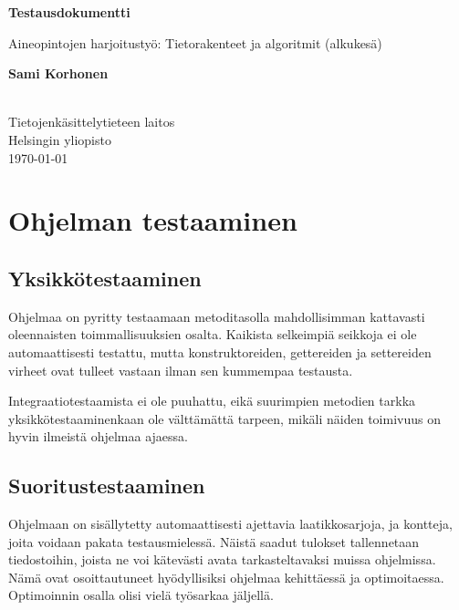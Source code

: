 \documentclass[a4paper,12pt, titlepage]{article}
\begin{document}
\begin{titlepage}
    \begin{center}
        \vspace*{1cm}
        
        \LARGE
        \textbf{Testausdokumentti}
        
        \vspace{0.5cm}
        \Large
        Aineopintojen harjoitustyö: Tietorakenteet ja algoritmit (alkukesä)
        
        \vspace{1.5cm}
        
        \large
        \textbf{Sami Korhonen} \\
         \\
        
		\vfill        
        \normalsize
        Tietojenkäsittelytieteen laitos\\
        Helsingin yliopisto\\
		\large        
        \today
        
    \end{center}
\end{titlepage}



\section*{Ohjelman testaaminen}

\subsection*{Yksikkötestaaminen}
Ohjelmaa on pyritty testaamaan metoditasolla mahdollisimman kattavasti oleennaisten toimmallisuuksien osalta. Kaikista selkeimpiä seikkoja ei ole automaattisesti testattu, mutta konstruktoreiden, gettereiden ja settereiden virheet ovat tulleet vastaan ilman sen kummempaa testausta. 

Integraatiotestaamista ei ole puuhattu, eikä suurimpien metodien tarkka yksikkötestaaminenkaan ole välttämättä tarpeen, mikäli näiden toimivuus on hyvin ilmeistä ohjelmaa ajaessa.

\subsection*{Suoritustestaaminen}
Ohjelmaan on sisällytetty automaattisesti ajettavia laatikkosarjoja, ja kontteja, joita voidaan pakata testausmielessä. Näistä saadut tulokset tallennetaan tiedostoihin, joista ne voi kätevästi avata tarkasteltavaksi muissa ohjelmissa. Nämä ovat osoittautuneet hyödyllisiksi ohjelmaa kehittäessä ja optimoitaessa. Optimoinnin osalla olisi vielä työsarkaa jäljellä.
\end{document}
